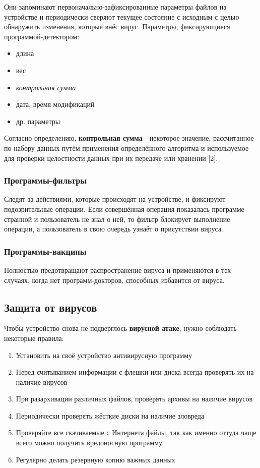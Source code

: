 \documentclass[12pt]{article}
\begin{document}
Они запоминают первоначально-зафиксированные параметры файлов на устройстве и периодически сверяют текущее состояние с исходным с целью обнаружить изменения, которые внёс вирус. Параметры, фиксирующиеся программой-детектором:

\begin{itemize}
    \item длина
    \item вес
    \item \textit{контрольная сумма}
    \item дата, время модификаций
    \item др. параметры
\end{itemize}

Согласно определению, \textbf{контрольная сумма} - некоторое значение, рассчитанное по набору данных путём применения определённого алгоритма и используемое для проверки целостности данных при их передаче или хранении [2].

\subsubsection*{Программы-фильтры}
Следят за действиями, которые происходят на устройстве, и фиксируют подозрительные операции. Если совершённая операция показалась программе странной и пользователь не знал о ней, то фильтр блокирует выполнение операции, а пользователь в свою очередь узнаёт о присутствии вируса.

\subsubsection*{Программы-вакцины}
Полностью предотвращают распространение вируса и применяются в тех случаях, когда нет программ-докторов, способных избавится от вируса.

\subsection*{Защита от вирусов}
Чтобы устройство снова не подверглось \textbf{вирусной атаке}, нужно соблюдать некоторые правила:

\begin{enumerate}
    \item Установить на своё устройство антивирусную программу
    \item Перед считыванием информации с флешки или диска всегда проверять их на наличие вирусов
    \item При разархивации различных файлов, проверять архивы на наличие вирусов
    \item Периодически проверять жёсткие диски на наличие зловреда
    \item Проверяйте все скачиваемые с Интернета файлы, так как именно оттуда чаще всего можно получить вредоносную программу
    \item Регулярно делать резервную копию важных данных
\end{enumerate}
\end{document}
